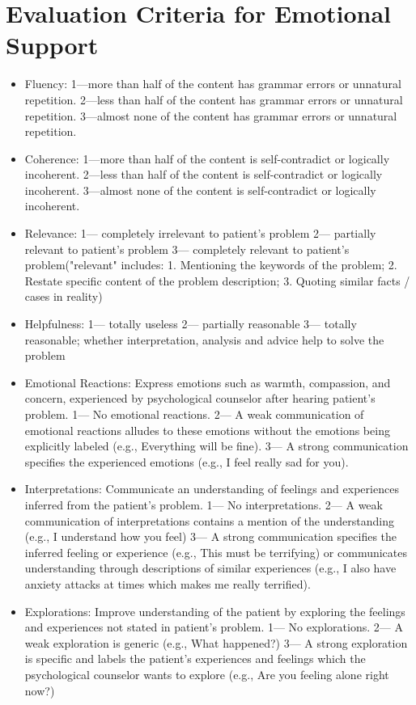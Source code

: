 \section{Evaluation Criteria for Emotional Support}
\label{app: emotional support}
\begin{itemize}
    \item Fluency: 1—more than half of the content has grammar errors or unnatural repetition. 2—less than half of the content has grammar errors or unnatural repetition. 3—almost none of the content has grammar errors or unnatural repetition.
    \item Coherence: 1—more than half of the content is self-contradict or logically incoherent. 2—less than half of the content is self-contradict or logically incoherent. 3—almost none of the content is self-contradict or logically incoherent.
    \item Relevance: 1— completely irrelevant to patient's problem 2— partially relevant to patient's problem 3— completely relevant to patient's problem("relevant" includes: 1. Mentioning the keywords of the problem; 2. Restate specific content of the problem description; 3. Quoting similar facts / cases in reality)
    \item Helpfulness: 1— totally useless 2— partially reasonable 3— totally reasonable; whether interpretation, analysis and advice help to solve the problem
    \item Emotional Reactions: Express emotions such as warmth, compassion, and concern, experienced by psychological counselor after hearing patient's problem. 1— No emotional reactions. 2— A weak communication of emotional reactions alludes to these emotions without the emotions being explicitly labeled (e.g., Everything will be fine). 3— A strong communication specifies the experienced emotions (e.g., I feel really sad for you).
    \item Interpretations: Communicate an understanding of feelings and experiences inferred from the patient's problem. 1— No interpretations. 2— A weak communication of interpretations contains a mention of the understanding (e.g., I understand how you feel) 3— A strong communication specifies the inferred feeling or experience (e.g., This must be terrifying) or communicates understanding through descriptions of similar experiences (e.g., I also have anxiety attacks at times which makes me really terrified).
    \item Explorations: Improve understanding of the patient by exploring the feelings and experiences not stated in patient's problem. 1— No explorations. 2— A weak exploration is generic (e.g., What happened?) 3— A strong exploration is specific and labels the patient's experiences and feelings which the psychological counselor wants to explore (e.g., Are you feeling alone right now?)

\end{itemize}
